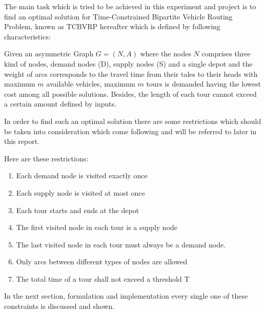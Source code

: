 The main task which is tried to be achieved in this experiment and project
is to find an optimal solution for Time-Constrained Bipartite Vehicle Routing
Problem, known as TCBVRP hereafter which is defined by following
characteristics:

Given an asymmetric Graph $G=(N,A)$ where the nodes $N$ comprises three kind of
nodes, demand nodes (D), supply nodes (S) and a single depot and the weight of
arcs corresponds to the travel time from their tales to their heads with maximum
$m$ available vehicles, maximum $m$ tours is demanded having the lowest cost
among all possible solutions. Besides, the length of each tour cannot exceed a
certain amount defined by inputs.

In order to find such an optimal solution there are some restrictions which
should be taken into consideration which come following and will be referred to
later in this report.

Here are these restrictions:

\begin{enumerate}
  \item Each demand node is visited exactly once
  \item Each supply node is visited at most once
  \item Each tour starts and ends at the depot
  \item The first visited node in each tour is a supply node
  \item The last visited node in each tour must always be a demand
node.
\item Only arcs between different types of nodes are allowed
\item The total time of a tour shall not exceed a threshold T
\end{enumerate}

In the next section, formulation and implementation every single one of these
constraints is discussed and shown.
